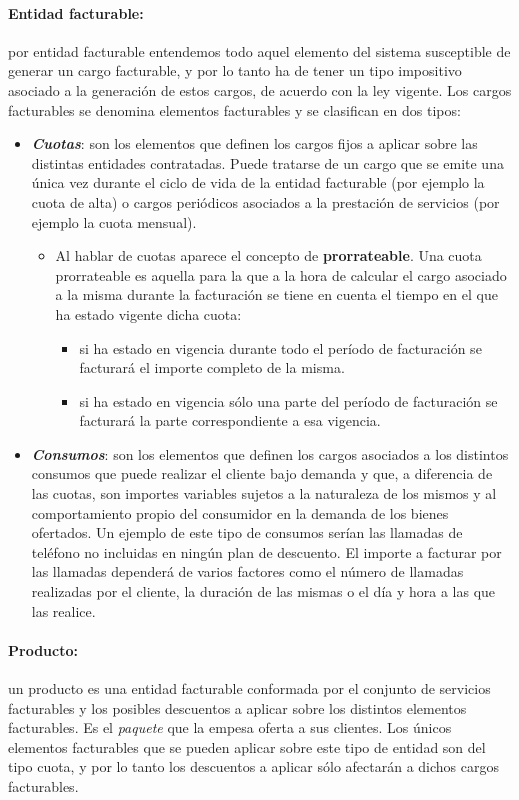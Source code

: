 \paragraph{Entidad facturable:} por entidad facturable entendemos todo aquel elemento del sistema susceptible de generar un cargo facturable, y por lo tanto ha de tener un tipo impositivo asociado a la generación de estos cargos, de acuerdo con la ley vigente. Los cargos facturables se denomina elementos facturables y se clasifican en dos tipos:
\begin{itemize}
	\item \emph{\textbf{Cuotas}}: son los elementos que definen los cargos fijos a aplicar sobre las distintas entidades contratadas. Puede tratarse de un cargo que se emite una única vez durante el ciclo de vida de la entidad facturable (por ejemplo la cuota de alta) o cargos periódicos asociados a la prestación de servicios (por ejemplo la cuota mensual).
	\begin{itemize}
		\item Al hablar de cuotas aparece el concepto de \textbf{prorrateable}. Una cuota prorrateable es aquella para la que a la hora de calcular el cargo asociado a la misma durante la facturación se tiene en cuenta el tiempo en el que ha estado vigente dicha cuota: 
		\begin{itemize}
			\item si ha estado en vigencia durante todo el período de facturación se 		facturará el importe completo de la misma.
			\item si ha estado en vigencia sólo una parte del período de facturación se facturará la parte correspondiente a esa vigencia. 
		\end{itemize}
	\end{itemize}
	\item \emph{\textbf{Consumos}}: son los elementos que definen los cargos asociados a los distintos consumos que puede realizar el cliente bajo demanda y que, a diferencia de las cuotas, son importes variables sujetos a la naturaleza de los mismos y al comportamiento propio del consumidor en la demanda de los bienes ofertados. Un ejemplo de este tipo de consumos serían las llamadas de teléfono no incluidas en ningún plan de descuento. El importe a facturar por las llamadas dependerá de varios factores como el número de llamadas realizadas por el cliente, la duración de las mismas o el día y hora a las que las realice.
\end{itemize}


\paragraph{Producto:} un producto es una entidad facturable conformada por el conjunto de servicios facturables y los posibles descuentos a aplicar sobre los distintos elementos facturables. Es el \textit{paquete} que la empesa oferta a sus clientes. Los únicos elementos facturables que se pueden aplicar sobre este tipo de entidad son del tipo cuota, y por lo tanto los descuentos a aplicar sólo afectarán a dichos cargos facturables.

